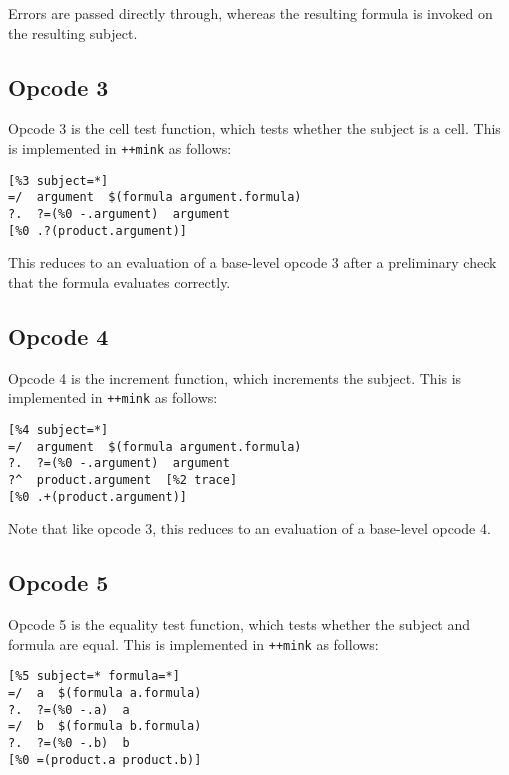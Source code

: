 \documentclass[twoside]{article}
\begin{document}
\noindent
Errors are passed directly through, whereas the resulting formula is invoked on the resulting subject.

\subsection{Opcode 3}

Opcode 3 is the cell test function, which tests whether the subject is a cell.  This is implemented in \lstinline[style=inlinecode]{++mink} as follows:

\begin{lstlisting}[style=listingcode]
  [%3 subject=*]
=/  argument  $(formula argument.formula)
?.  ?=(%0 -.argument)  argument
[%0 .?(product.argument)]
\end{lstlisting}

\noindent
This reduces to an evaluation of a base-level opcode 3 after a preliminary check that the formula evaluates correctly.

\subsection{Opcode 4}

Opcode 4 is the increment function, which increments the subject.  This is implemented in \lstinline[style=inlinecode]{++mink} as follows:

\begin{lstlisting}[style=listingcode]
  [%4 subject=*]
=/  argument  $(formula argument.formula)
?.  ?=(%0 -.argument)  argument
?^  product.argument  [%2 trace]
[%0 .+(product.argument)]
\end{lstlisting}

\noindent
Note that like opcode 3, this reduces to an evaluation of a base-level opcode 4.

\subsection{Opcode 5}

Opcode 5 is the equality test function, which tests whether the subject and formula are equal.  This is implemented in \lstinline[style=inlinecode]{++mink} as follows:

\begin{lstlisting}[style=listingcode]
  [%5 subject=* formula=*]
=/  a  $(formula a.formula)
?.  ?=(%0 -.a)  a
=/  b  $(formula b.formula)
?.  ?=(%0 -.b)  b
[%0 =(product.a product.b)]
\end{lstlisting}
\end{document}
